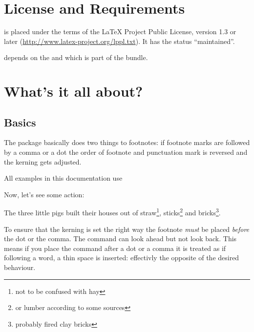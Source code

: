 \documentclass[toc=index,toc=bib]{cnpkgdoc}
\renewcommand\thempfootnote{\arabic{mpfootnote}}
\begin{document}
\section{License and Requirements}
\fnpct is placed under the terms of the LaTeX Project Public License,
version 1.3 or later (\url{http://www.latex-project.org/lppl.txt}).
It has the status \enquote{maintained}.

\fnpct depends on the  and  which is part of the
 bundle.

\newpage
\section{What's it all about?}
\subsection{Basics}
The \fnpct package basically does two things to footnotes: if footnote marks are
followed by a comma or a dot the order of footnote and punctuation mark is reversed
and the kerning gets adjusted.

All examples in this documentation use
\begin{beispiel}
 \renewcommand\thempfootnote{\arabic{mpfootnote}}
\end{beispiel}

Now, let's see some action:
\begin{beispiel}
 \begin{minipage}{.4\linewidth}
  \noindent The three little pigs built their houses
  out of straw\footnote{not to be confused with hay},
  sticks\footnote{or lumber according to some sources}
  and bricks\footnote{probably fired clay bricks}.
 \end{minipage}
\end{beispiel}

To ensure that the kerning is set the right way the footnote \emph{must} be placed
\emph{before} the dot or the comma. The command can look ahead but not look back.
This means if you place the  command after a dot or a comma it is
treated as if following a word, \ie a thin space is inserted: effectivly the opposite 
of the desired behaviour.
\end{document}
